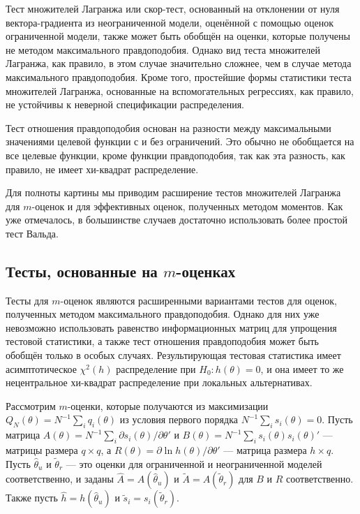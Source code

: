 Тест множителей Лагранжа или скор-тест, основанный на отклонении от нуля вектора-градиента из неограниченной модели, оценённой с помощью оценок ограниченной модели, также может быть обобщён на оценки, которые получены не методом максимального правдоподобия. Однако вид теста множителей Лагранжа, как правило, в этом случае значительно сложнее, чем в случае метода максимального правдоподобия. Кроме того, простейшие формы статистики теста множителей Лагранжа, основанные на вспомогательных регрессиях, как правило, не устойчивы к неверной спецификации распределения.

Тест отношения правдоподобия основан на разности между максимальными значениями целевой функции с и без ограничений. Это обычно не обобщается на все целевые функции, кроме функции правдоподобия, так как эта разность, как правило, не имеет хи-квадрат распределение.

Для полноты картины мы приводим расширение тестов множителей Лагранжа для $m$-оценок и для эффективных оценок, полученных методом моментов. Как уже отмечалось, в большинстве случаев достаточно использовать более простой тест Вальда.

\subsection{Тесты, основанные на $m$-оценках}

Тесты для $m$-оценок являются расширенными вариантами тестов для оценок, полученных методом максимального правдоподобия. Однако для них уже невозможно использовать равенство информационных матриц для упрощения тестовой статистики, а также тест отношения правдоподобия может быть обобщён только в особых случаях. Результирующая тестовая статистика имеет асимптотическое $\chi^2(h)$ распределение при $H_0: h(\theta) = 0$, и она имеет то же нецентральное хи-квадрат распределение при локальных альтернативах.

Рассмотрим $m$-оценки, которые получаются из максимизации $Q_N(\theta) = N^{-1}\sum_i q_i(\theta)$ из условия первого порядка $N^{-1}\sum_i s_i(\theta) = 0$. Пусть матрица $A(\theta) = N^{-1}\sum_i \partial{s_i(\theta)}/\partial{\theta}'$ и $B(\theta) = N^{-1}\sum_i s_i(\theta)s_i(\theta)'$ --- матрицы размера $q \times q$, а $R(\theta) = \partial{\ln h(\theta)}/\partial{\theta}'$ --- матрица размера $h \times q$. Пусть $\hat{\theta}_u$ и $\tilde{\theta}_r$ --- это оценки для ограниченной и неограниченной моделей соответственно, и заданы $\hat{A} = A(\hat{\theta}_u)$ и $\tilde{A}= A(\tilde{\theta}_r)$ для $B$ и $R$ соответственно. Также пусть $\hat{h} = h(\hat{\theta}_u)$ и $\tilde{s}_i = s_i(\tilde{\theta}_r)$.

